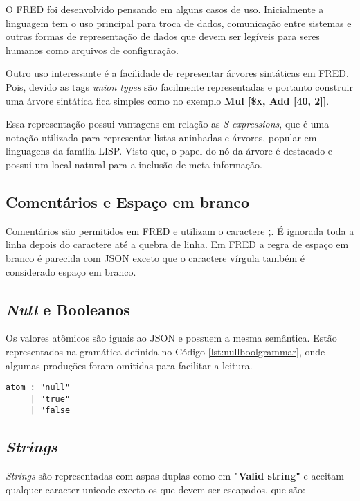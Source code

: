 O FRED foi desenvolvido pensando em alguns casos de uso. Inicialmente a linguagem
tem o uso principal para troca de dados, comunicação entre sistemas e
outras formas de representação de dados que devem ser legíveis para seres humanos
como arquivos de configuração.

Outro uso interessante é a facilidade de representar árvores sintáticas em FRED.
Pois, devido as tags \textit{union types} são facilmente representadas 
e portanto construir uma árvore sintática fica simples como no exemplo
\textbf{Mul [\$x, Add [40, 2]]}.

Essa representação possui vantagens em relação as \textit{S-expressions}, que
é uma notação utilizada para representar listas aninhadas e árvores, popular em linguagens da família 
LISP. Visto que, o papel do nó da árvore é destacado e possui um local natural para a 
inclusão de meta-informação.

\subsection{Comentários e Espaço em branco}

Comentários são permitidos em FRED e utilizam o caractere \textbf{;}. É ignorada
toda a linha depois do caractere até a quebra de linha. Em FRED a regra de 
espaço em branco é parecida com JSON exceto que o caractere vírgula também
é considerado espaço em branco.

\subsection{\textit{Null} e Booleanos}

Os valores atômicos são iguais ao JSON e possuem a mesma semântica.
Estão representados na gramática definida no Código \ref{lst:nullboolgrammar}, onde algumas produções
foram omitidas para facilitar a leitura.

\begin{lstlisting}[caption=Gramática para bools e null,label={lst:nullboolgrammar}]
atom : "null"
     | "true"
     | "false
\end{lstlisting}    

\subsection{\textit{Strings}}

\textit{Strings} são representadas com aspas duplas como em \textbf{"Valid string"} 
e aceitam qualquer caracter unicode exceto os que devem ser escapados,  
que são:

